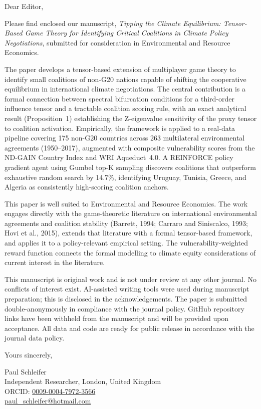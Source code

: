 \documentclass[11pt]{article}
\begin{document}
\thispagestyle{empty}

\noindent Dear Editor,

\bigskip

Please find enclosed our manuscript, \textit{Tipping the Climate Equilibrium: Tensor-Based Game Theory for Identifying Critical Coalitions in Climate Policy Negotiations}, submitted for consideration in Environmental and Resource Economics.

\medskip

The paper develops a tensor-based extension of multiplayer game theory to identify small coalitions of non-G20 nations capable of shifting the cooperative equilibrium in international climate negotiations. The central contribution is a formal connection between spectral bifurcation conditions for a third-order influence tensor and a tractable coalition scoring rule, with an exact analytical result (Proposition~1) establishing the Z-eigenvalue sensitivity of the proxy tensor to coalition activation. Empirically, the framework is applied to a real-data pipeline covering 175 non-G20 countries across 263 multilateral environmental agreements (1950--2017), augmented with composite vulnerability scores from the ND-GAIN Country Index and WRI Aqueduct~4.0. A REINFORCE policy gradient agent using Gumbel top-K sampling discovers coalitions that outperform exhaustive random search by 14.7\%, identifying Uruguay, Tunisia, Greece, and Algeria as consistently high-scoring coalition anchors.

\medskip

This paper is well suited to Environmental and Resource Economics. The work engages directly with the game-theoretic literature on international environmental agreements and coalition stability (Barrett, 1994; Carraro and Siniscalco, 1993; Hovi et al., 2015), extends that literature with a formal tensor-based framework, and applies it to a policy-relevant empirical setting. The vulnerability-weighted reward function connects the formal modelling to climate equity considerations of current interest in the literature.

\medskip

This manuscript is original work and is not under review at any other journal. No conflicts of interest exist. AI-assisted writing tools were used during manuscript preparation; this is disclosed in the acknowledgements. The paper is submitted double-anonymously in compliance with the journal policy. GitHub repository links have been withheld from the manuscript and will be provided upon acceptance. All data and code are ready for public release in accordance with the journal data policy.

\bigskip

\noindent Yours sincerely,

\bigskip
\bigskip

\noindent Paul Schleifer\\
Independent Researcher, London, United Kingdom\\
ORCID: \href{https://orcid.org/0009-0004-7972-3566}{0009-0004-7972-3566}\\
\href{mailto:paul_schleifer@hotmail.com}{paul\_schleifer@hotmail.com}
\end{document}
